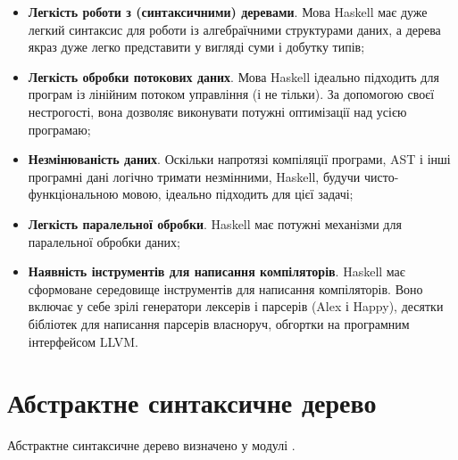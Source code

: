 \documentclass[main.tex]{subfiles}
\begin{document}
\begin{itemize}
\item \textbf{Легкість роботи з (синтаксичними) деревами}.
  Мова Haskell має дуже легкий синтаксис для роботи із алгебраїчними структурами даних, а дерева якраз дуже легко представити у вигляді суми і добутку типів;
\item \textbf{Легкість обробки потокових даних}.
  Мова Haskell ідеально підходить для програм із лінійним потоком управління (і не тільки).
  За допомогою своєї нестрогості, вона дозволяє виконувати потужні оптимізації над усією програмаю;
\item \textbf{Незмінюваність даних}.
  Оскільки напротязі компіляції програми, AST і інші програмні дані логічно тримати незмінними, Haskell, будучи чисто-функціональною мовою, ідеально підходить для цієї задачі;
\item \textbf{Легкість паралельної обробки}.
  Haskell має потужні механізми для паралельної обробки даних;
\item \textbf{Наявність інструментів для написання компіляторів}.
  Haskell має сформоване середовище інструментів для написання компіляторів.
  Воно включає у себе зрілі генератори лексерів і парсерів (Alex і Happy), десятки бібліотек для написання парсерів власноруч, обгортки на програмним інтерфейсом LLVM.
\end{itemize}

\section{Абстрактне синтаксичне дерево}
Абстрактне синтаксичне дерево визначено у модулі .
\end{document}
